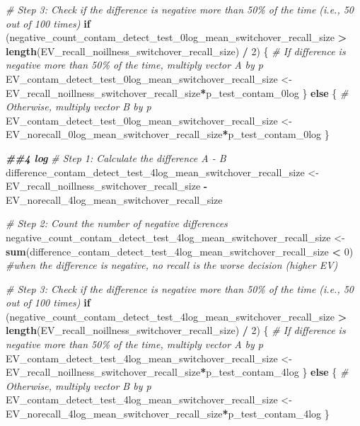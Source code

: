 \documentclass[
]{article}
\newenvironment{Shaded}{\begin{snugshade}}{\end{snugshade}}
\newcommand{\CommentTok}[1]{\textcolor[rgb]{0.56,0.35,0.01}{\textit{#1}}}
\newcommand{\ControlFlowTok}[1]{\textcolor[rgb]{0.13,0.29,0.53}{\textbf{#1}}}
\newcommand{\DecValTok}[1]{\textcolor[rgb]{0.00,0.00,0.81}{#1}}
\newcommand{\DocumentationTok}[1]{\textcolor[rgb]{0.56,0.35,0.01}{\textbf{\textit{#1}}}}
\newcommand{\FunctionTok}[1]{\textcolor[rgb]{0.13,0.29,0.53}{\textbf{#1}}}
\newcommand{\NormalTok}[1]{#1}
\newcommand{\OtherTok}[1]{\textcolor[rgb]{0.56,0.35,0.01}{#1}}
\newcommand{\SpecialCharTok}[1]{\textcolor[rgb]{0.81,0.36,0.00}{\textbf{#1}}}
\begin{document}
\begin{Shaded}
\begin{Highlighting}[]
\CommentTok{\# Step 3: Check if the difference is negative more than 50\% of the time (i.e., 50 out of 100 times)}
\ControlFlowTok{if}\NormalTok{ (negative\_count\_contam\_detect\_test\_0log\_mean\_switchover\_recall\_size }\SpecialCharTok{\textgreater{}} \FunctionTok{length}\NormalTok{(EV\_recall\_noillness\_switchover\_recall\_size) }\SpecialCharTok{/} \DecValTok{2}\NormalTok{) \{}
  \CommentTok{\# If difference is negative more than 50\% of the time, multiply vector A by p}
\NormalTok{  EV\_contam\_detect\_test\_0log\_mean\_switchover\_recall\_size }\OtherTok{\textless{}{-}}\NormalTok{ EV\_recall\_noillness\_switchover\_recall\_size}\SpecialCharTok{*}\NormalTok{p\_test\_contam\_0log}
\NormalTok{\} }\ControlFlowTok{else}\NormalTok{ \{}
  \CommentTok{\# Otherwise, multiply vector B by p}
\NormalTok{ EV\_contam\_detect\_test\_0log\_mean\_switchover\_recall\_size  }\OtherTok{\textless{}{-}}\NormalTok{ EV\_norecall\_0log\_mean\_switchover\_recall\_size}\SpecialCharTok{*}\NormalTok{p\_test\_contam\_0log}
\NormalTok{\}}



\DocumentationTok{\#\#4 log}
\CommentTok{\# Step 1: Calculate the difference A {-} B}
\NormalTok{difference\_contam\_detect\_test\_4log\_mean\_switchover\_recall\_size }\OtherTok{\textless{}{-}}\NormalTok{ EV\_recall\_noillness\_switchover\_recall\_size }\SpecialCharTok{{-}}\NormalTok{ EV\_norecall\_4log\_mean\_switchover\_recall\_size}

\CommentTok{\# Step 2: Count the number of negative differences}
\NormalTok{negative\_count\_contam\_detect\_test\_4log\_mean\_switchover\_recall\_size }\OtherTok{\textless{}{-}} \FunctionTok{sum}\NormalTok{(difference\_contam\_detect\_test\_4log\_mean\_switchover\_recall\_size }\SpecialCharTok{\textless{}} \DecValTok{0}\NormalTok{) }\CommentTok{\#when the difference is negative, no recall is the worse decision (higher EV)}

\CommentTok{\# Step 3: Check if the difference is negative more than 50\% of the time (i.e., 50 out of 100 times)}
\ControlFlowTok{if}\NormalTok{ (negative\_count\_contam\_detect\_test\_4log\_mean\_switchover\_recall\_size }\SpecialCharTok{\textgreater{}} \FunctionTok{length}\NormalTok{(EV\_recall\_noillness\_switchover\_recall\_size) }\SpecialCharTok{/} \DecValTok{2}\NormalTok{) \{}
  \CommentTok{\# If difference is negative more than 50\% of the time, multiply vector A by p}
\NormalTok{  EV\_contam\_detect\_test\_4log\_mean\_switchover\_recall\_size }\OtherTok{\textless{}{-}}\NormalTok{ EV\_recall\_noillness\_switchover\_recall\_size}\SpecialCharTok{*}\NormalTok{p\_test\_contam\_4log}
\NormalTok{\} }\ControlFlowTok{else}\NormalTok{ \{}
  \CommentTok{\# Otherwise, multiply vector B by p}
\NormalTok{ EV\_contam\_detect\_test\_4log\_mean\_switchover\_recall\_size  }\OtherTok{\textless{}{-}}\NormalTok{ EV\_norecall\_4log\_mean\_switchover\_recall\_size}\SpecialCharTok{*}\NormalTok{p\_test\_contam\_4log}
\NormalTok{\}}




\end{Highlighting}
\end{Shaded}
\end{document}
